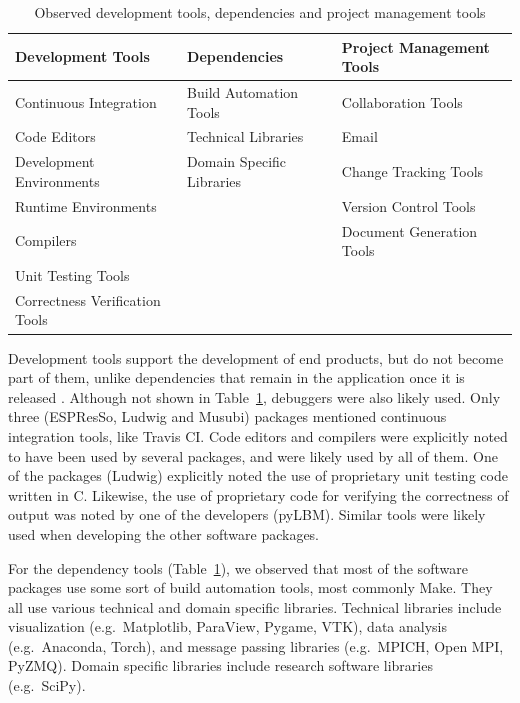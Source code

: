 \documentclass[final, 3p, times, authoryear]{elsarticle}
\begin{document}
\begin{table}
	\begin{center}
	\begin{tabular}{ p{5.3 cm} p{4.9 cm} p{5 cm}}
	\toprule
	\textbf{Development Tools} & \textbf{Dependencies} & \textbf{Project
	Management Tools} \\
	\midrule
	Continuous Integration & Build Automation Tools & Collaboration Tools\\
	Code Editors & Technical Libraries & Email\\
	Development Environments & Domain Specific Libraries & Change Tracking Tools\\
	Runtime Environments &  & Version Control Tools\\
	Compilers &  & Document Generation Tools\\
	Unit Testing Tools &  & \\
	Correctness Verification Tools &  & \\
	\bottomrule
	\end{tabular}
	\caption{Observed development tools, dependencies and project management
	tools} \label{tbl_tools}
	\end{center}
\end{table}

Development tools support the development of end products, but do not become
part of them, unlike dependencies that remain in the application once it is
released \citep[p.\ 506]{GhezziEtAl2003}. Although not shown in
Table~\ref{tbl_tools}, debuggers were also likely used.  Only three (ESPResSo,
Ludwig and Musubi) packages mentioned continuous integration tools, like Travis
CI. Code editors and compilers were explicitly noted to have been used by
several packages, and were likely used by all of them. One of the packages
(Ludwig) explicitly noted the use of proprietary unit testing code written in C.
Likewise, the use of proprietary code for verifying the correctness of output
was noted by one of the developers (pyLBM). Similar tools were likely used when
developing the other software packages.

For the dependency tools (Table~\ref{tbl_tools}), we observed that most of the
software packages use some sort of build automation tools, most commonly Make.
They all use various technical and domain specific libraries. Technical
libraries include visualization (e.g.\ Matplotlib, ParaView, Pygame, VTK), data
analysis (e.g.\ Anaconda, Torch), and message passing libraries (e.g.\ MPICH,
Open MPI, PyZMQ). Domain specific libraries include research software libraries
(e.g.\ SciPy).
\end{document}
